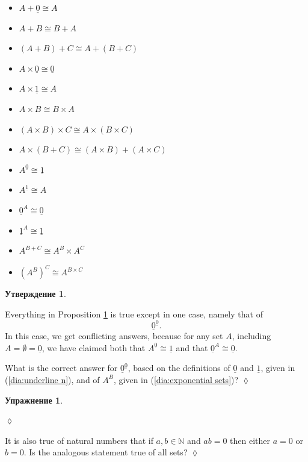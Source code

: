 \documentclass[a4paper]{book}
\def\NN{{\mathbb N}}
\def\iso{\cong}
\def\ul{\underline}
\theoremstyle{myth}
\newtheorem{propositionENG}[envENG]{\begin{english}Proposition\end{english}}
\newtheorem{excENG}[envENG]{\begin{english}Exercise\end{english}}
\newenvironment{exerciseENG}{\begin{excENG}}{\hspace*{\fill}$\lozenge$\end{excENG}}
\newtheorem{propositionRUS}[envRUS]{Утверждение}
\newtheorem{excRUS}[envRUS]{Упражнение}
\newenvironment{exerciseRUS}{\begin{excRUS}}{\hspace*{\fill}$\lozenge$\end{excRUS}}
\begin{document}
\begin{russian}
\begin{propositionENG}
\begin{itemize}
\item $A+\ul{0}\iso A$
\item $A + B\iso B + A$
\item $(A + B) + C \iso A + (B + C)$
\item $A\times\ul{0}\iso\ul{0}$
\item $A\times\ul{1}\iso A$
\item $A\times B\iso B\times A$
\item $(A\times B)\times C \iso A\times (B\times C)$
\item $A\times(B+C)\iso (A\times B)+(A\times C)$
\item $A^{\ul{0}}\iso \ul{1}$
\item $A^{\ul{1}}\iso A$
\item $\ul{0}^A\iso\ul{0}$
\item $\ul{1}^A\iso\ul{1}$
\item $A^{B+C}\iso A^B\times A^C$
\item $(A^B)^C\iso A^{B\times C}$
\end{itemize}
\end{propositionENG}

\begin{propositionRUS}\label{prop:arithmetic of sets}
 
\end{propositionRUS}

\begin{exerciseENG}\label{exc:0 to the 0}
Everything in Proposition \ref{prop:arithmetic of sets} is true except in one case, namely that of $$\ul{0}^{\ul{0}}.$$ In this case, we get conflicting answers, because for any set $A$, including $A=\emptyset=\ul{0}$, we have claimed both that $A^{\ul{0}}\iso\ul{1}$ and that $\ul{0}^A\iso\ul{0}.$ 

What is the correct answer for $\ul{0}^{\ul{0}}$, based on the definitions of $\ul{0}$ and $\ul{1}$, given in (\ref{dia:underline n}), and of $A^B$, given in (\ref{dia:exponential sets})?
\end{exerciseENG}

\begin{exerciseRUS}\label{exc:0 to the 0}
 
\end{exerciseRUS}

\begin{exerciseENG}
It is also true of natural numbers that if $a,b\in\NN$ and $ab=0$ then either $a=0$ or $b=0$. Is the analogous statement true of all sets?
\end{exerciseENG}


\end{russian}
\end{document}
